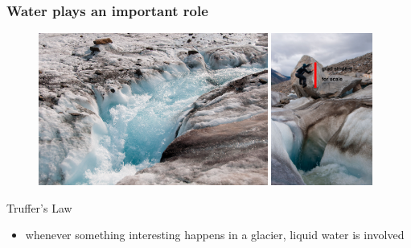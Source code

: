 \documentclass[hide notes,intlimits,unknownkeysallowed]{beamer}
\begin{document}
\begin{frame}
  \frametitle{Water plays an important role}
  \begin{figure}
    \includegraphics[height=5cm]{black-rapids-1} \vspace{0.25em}
    \includegraphics[height=5cm]{black-rapids-2}
  \end{figure}
  \begin{block}{Truffer's Law}
    \begin{itemize}
    \item whenever something interesting happens in a glacier, liquid water is involved
    \end{itemize}
  \end{block}
\end{frame}

  {
} 
\end{document}
